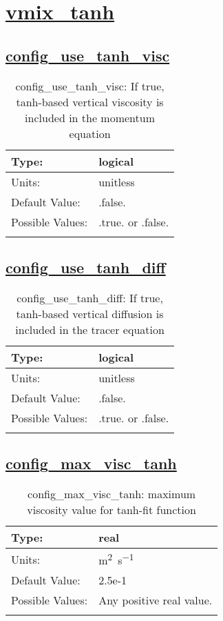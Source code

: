 \section[vmix\_tanh]{\hyperref[sec:nm_tab_vmix_tanh]{vmix\_tanh}}
\label{sec:nm_sec_vmix_tanh}
\subsection[config\_use\_tanh\_visc]{\hyperref[sec:nm_tab_vmix_tanh]{config\_use\_tanh\_visc}}
\label{subsec:nm_sec_config_use_tanh_visc}
\begin{center}
\begin{longtable}{| p{2.0in} || p{4.0in} |}
    \hline
    Type: & logical \\
    \hline
    Units: & \si{unitless} \\
    \hline
    Default Value: & .false. \\
    \hline
    Possible Values: & .true. or .false. \\
    \hline
    \caption{config\_use\_tanh\_visc: If true, tanh-based vertical viscosity is included in the momentum equation}
\end{longtable}
\end{center}
\subsection[config\_use\_tanh\_diff]{\hyperref[sec:nm_tab_vmix_tanh]{config\_use\_tanh\_diff}}
\label{subsec:nm_sec_config_use_tanh_diff}
\begin{center}
\begin{longtable}{| p{2.0in} || p{4.0in} |}
    \hline
    Type: & logical \\
    \hline
    Units: & \si{unitless} \\
    \hline
    Default Value: & .false. \\
    \hline
    Possible Values: & .true. or .false. \\
    \hline
    \caption{config\_use\_tanh\_diff: If true, tanh-based vertical diffusion is included in the tracer equation}
\end{longtable}
\end{center}
\subsection[config\_max\_visc\_tanh]{\hyperref[sec:nm_tab_vmix_tanh]{config\_max\_visc\_tanh}}
\label{subsec:nm_sec_config_max_visc_tanh}
\begin{center}
\begin{longtable}{| p{2.0in} || p{4.0in} |}
    \hline
    Type: & real \\
    \hline
    Units: & \si{m^2.s^{-1}} \\
    \hline
    Default Value: & 2.5e-1 \\
    \hline
    Possible Values: & Any positive real value. \\
    \hline
    \caption{config\_max\_visc\_tanh: maximum viscosity value for tanh-fit function}
\end{longtable}
\end{center}
